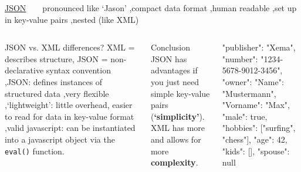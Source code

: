 \begin{frame}[fragile]{\href{https://en.wikipedia.org/wiki/JSON}{JSON}}
\footnotesize
{}~ ~ pronounced like `Jason' \sep compact data format \sep human readable \sep set up in key-value pairs \sep nested (like XML) \\

\begin{columns}
\begin{block}{JSON vs. XML differences?}\scriptsize
XML = describes structure, JSON = non-declarative syntax convention \sep JSON: defines instances of structured data \sep very flexible \sep `lightweight': little overhead, easier to read for data in key-value format \sep valid javascript: can be instantiated into a javascript object via the \verb|eval()| function.
\end{block}

\begin{block}{Conclusion}\scriptsize
JSON has advantages if you just need simple key-value pairs (\textbf{`simplicity'}). XML has more and allows for more \textbf{complexity}.
~\\
~
\end{block}

\begin{jscode}
{
  "publisher": "Xema",
  "number": "1234-5678-9012-3456",
  "owner":
  {
    "Name": "Mustermann",
    "Vorname": "Max",
    "male": true,
    "hobbies": ["surfing", "chess"],
    "age": 42,
    "kids": [],
    "spouse": null
  }
}
\end{jscode}
\end{columns}


\end{frame}


